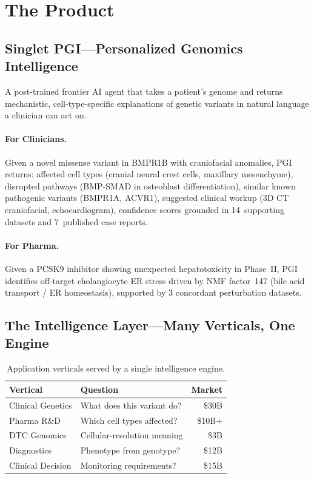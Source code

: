 \documentclass[10pt,twocolumn,letterpaper]{article}
\begin{document}
\section{The Product}
\label{sec:product}

\subsection{Singlet PGI---Personalized Genomics Intelligence}

A post-trained frontier AI agent that takes a patient's genome and returns
mechanistic, cell-type-specific explanations of genetic variants in natural
language a clinician can act on.

\paragraph{For Clinicians.} Given a novel missense variant in BMPR1B with
craniofacial anomalies, PGI returns: affected cell types (cranial neural crest
cells, maxillary mesenchyme), disrupted pathways (BMP-SMAD in osteoblast
differentiation), similar known pathogenic variants (BMPR1A, ACVR1), suggested
clinical workup (3D CT craniofacial, echocardiogram), confidence scores grounded
in 14~supporting datasets and 7~published case reports.

\paragraph{For Pharma.} Given a PCSK9 inhibitor showing unexpected hepatotoxicity
in Phase~II, PGI identifies off-target cholangiocyte ER stress driven by NMF
factor~147 (bile acid transport / ER homeostasis), supported by 3 concordant
perturbation datasets.

\subsection{The Intelligence Layer---Many Verticals, One Engine}

\begin{table}[h]
\centering
\small
\begin{tabular}{@{}llr@{}}
\toprule
\textbf{Vertical} & \textbf{Question} & \textbf{Market} \\
\midrule
Clinical Genetics & What does this variant do? & \$30B \\
Pharma R\&D & Which cell types affected? & \$10B+ \\
DTC Genomics & Cellular-resolution meaning & \$3B \\
Diagnostics & Phenotype from genotype? & \$12B \\
Clinical Decision & Monitoring requirements? & \$15B \\
\bottomrule
\end{tabular}
\caption{Application verticals served by a single intelligence engine.}
\label{tab:verticals}
\end{table}
\end{document}

